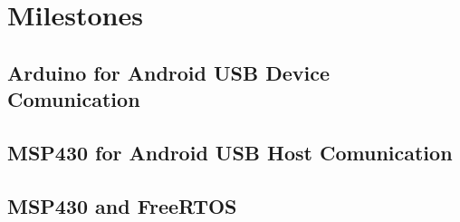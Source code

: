 

	
	\section{Milestones}	

		\subsection{Arduino for Android USB Device Comunication}

		\subsection{MSP430 for Android USB Host Comunication}


		\subsection{MSP430 and FreeRTOS}	
		

